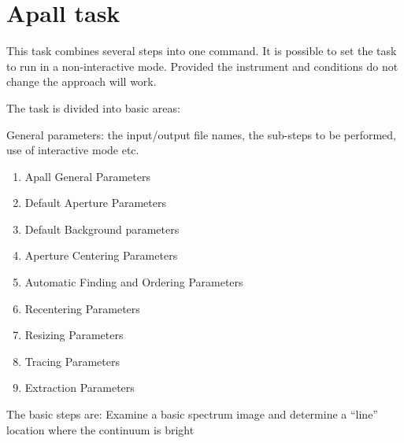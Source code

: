 \documentclass[letter,11pt,oneside]{article}
\begin{document}



\appendix \renewcommand {}

\section{Apall task}

This task combines several steps into one command. It is possible to 
set the task to run in a non-interactive mode. Provided the instrument
and conditions do not change the approach will work.

The task is divided into basic areas:

General parameters: the input/output file names, the sub-steps to be
performed, use of interactive mode etc.

\vspace{-.15cm}
\begin{enumerate}\addtolength{\itemsep}{-0.5\baselineskip}
   \item   Apall General Parameters
   \item   Default Aperture Parameters
   \item   Default Background parameters
   \item   Aperture Centering Parameters
   \item   Automatic Finding and Ordering Parameters
   \item   Recentering Parameters
   \item   Resizing Parameters
   \item   Tracing Parameters
   \item   Extraction Parameters
\end{enumerate}

The basic steps are:
   Examine a basic spectrum image and determine a ``line'' location where
   the continuum is bright
\end{document}
